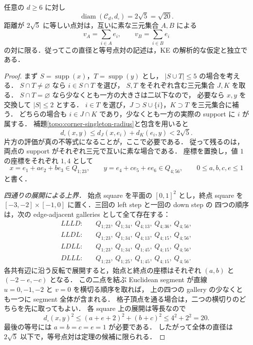 \begin{theorem}
\label{topo:diameter-six-labels}
任意の $d\ge6$ に対し
\[
 \operatorname{diam}(\mathcal C_d,d_\square)=2\sqrt5=\sqrt{20}.
\]
距離が $2\sqrt5$ に等しい点対は，互いに素な三元集合 $A,B$ による
\[
 v_A=\sum_{i\in A}e_i,\qquad v_B=\sum_{i\in B}e_i
\]
の対に限る．従ってこの直径と等号点対の記述は，KE の解析的な仮定と独立である．
\end{theorem}
\begin{proof}
まず $S=\operatorname{supp}(x)$，$T=\operatorname{supp}(y)$ とし，
$|S\cup T|\le5$ の場合を考える．
$S\cap T\ne\varnothing$ なら $i\in S\cap T$ を選び，
$S,T$ をそれぞれ含む三元集合 $J,K$ を取る．
$S\cap T=\varnothing$ なら少なくとも一方の大きさは二以下なので，
必要なら $x,y$ を交換して $|S|\le2$ とする．
$i\in T$ を選び，$J\supset S\cup\{i\}$，$K\supset T$ を三元集合に補う．
どちらの場合も $i\in J\cap K$ であり，少なくとも一方の実際の support に $i$ が属する．
補題\ref{topo:corner-singleton-radius}と包含を用いると
\[
 d_\square(x,y)
 \le d_J(x,e_i)+d_K(e_i,y)<2\sqrt5.
\]
片方の評価が真の不等式になることが，ここで必要である．
従って残るのは，両点の support がそれぞれ三元で互いに素な場合である．
座標を置換し，値 $1$ の座標をそれぞれ $1,4$ として
\[
 x=e_1+a e_2+b e_3\in Q_{1;23},\qquad
 y=e_4+c e_5+e e_6\in Q_{4;56},\qquad
 0\le a,b,c,e\le1
\]
と書く．

\emph{四通りの展開による上界．}
始点 square を平面の $[0,1]^2$ とし，終点 square を
$[-3,-2]\times[-1,0]$ に置く．三回の left step と一回の down step の
四つの順序は，次の edge-adjacent galleries として全て存在する：
\begin{align*}
 LLLD:&\quad Q_{1;23},\ Q_{1;34},\ Q_{4;13},\ Q_{4;36},\ Q_{4;56},\\
 LLDL:&\quad Q_{1;23},\ Q_{1;34},\ Q_{4;13},\ Q_{4;15},\ Q_{4;56},\\
 LDLL:&\quad Q_{1;23},\ Q_{1;34},\ Q_{1;45},\ Q_{4;15},\ Q_{4;56},\\
 DLLL:&\quad Q_{1;23},\ Q_{1;25},\ Q_{1;45},\ Q_{4;15},\ Q_{4;56}.
\end{align*}
各共有辺に沿う反転で展開すると，始点と終点の座標はそれぞれ
$(a,b)$ と $(-2-e,-c)$ となる．
この二点を結ぶ Euclidean segment が直線 $u=0,-1,-2$ と $v=0$ を横切る順序を取れば，
上の四つの gallery の少なくとも一つに segment 全体が含まれる．
格子頂点を通る場合は，二つの横切りのどちらを先に取ってもよい．
各 square 上の展開は等長なので
\begin{equation}\label{topo:eq:disjoint-square-upper}
 d_\square(x,y)^2
 \le (a+e+2)^2+(b+c)^2
 \le 4^2+2^2=20.
\end{equation}
最後の等号には $a=b=c=e=1$ が必要である．
したがって全体の直径は $2\sqrt5$ 以下で，等号点対は定理の候補に限られる．


\end{proof}
